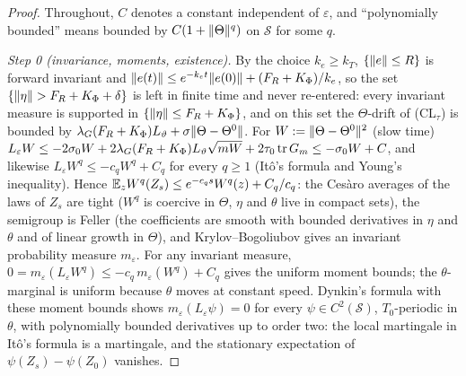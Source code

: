 \begin{proof}
Throughout, $C$ denotes a constant independent of $\varepsilon$, and ``polynomially bounded'' means bounded by
$C(1 + \lVert \Theta\rVert^q)$ on $\mathcal{S}$ for some $q$.

\smallskip
\emph{Step 0 (invariance, moments, existence).} By the choice $k_e\ge k_T$, $\{\lVert e\rVert\le R\}$ is forward invariant
and $\lVert e(t)\rVert\le e^{-k_et}\lVert e(0)\rVert + (F_R + K_\Phi)/k_e$, so the set $\{\lVert \eta\rVert > F_R + K_\Phi + \delta\}$
is left in finite time and never re-entered: every invariant measure is supported in $\{\lVert \eta\rVert\le F_R + K_\Phi\}$,
and on this set the $\Theta$-drift of (CL$_\tau$) is bounded by $\lambda_G(F_R + K_\Phi)L_\vartheta
+ \sigma\lVert \Theta - \Theta^0\rVert$. For $W := \lVert \Theta - \Theta^0\rVert^2$ (slow time)
$L_\varepsilon W\le-2\sigma_0W + 2\lambda_G(F_R + K_\Phi)L_\vartheta\sqrt{mW} + 2\tau_0\operatorname{tr} G_m\le-\sigma_0W + C$, and
likewise $L_\varepsilon W^q\le-c_qW^q + C_q$ for every $q\ge1$ (It\^o's formula and Young's inequality). Hence
$\mathbb{E}_zW^q(Z_s)\le e^{-c_qs}W^q(z) + C_q/c_q$: the Ces\`aro averages of the laws of $Z_s$ are tight ($W^q$ is coercive
in $\Theta$, $\eta$ and $\theta$ live in compact sets), the semigroup is Feller (the coefficients are smooth with
bounded derivatives in $\eta$ and $\theta$ and of linear growth in $\Theta$), and Krylov--Bogoliubov gives an
invariant probability measure $m_\varepsilon$. For any invariant measure,
$0 = m_\varepsilon(L_\varepsilon W^q)\le-c_q\,m_\varepsilon(W^q) + C_q$ gives the uniform moment bounds; the
$\theta$-marginal is uniform because $\theta$ moves at constant speed. Dynkin's formula with these moment bounds shows
$m_\varepsilon(L_\varepsilon\psi) = 0$ for every $\psi\in C^2(\mathcal{S})$, $T_0$-periodic in $\theta$, with
polynomially bounded derivatives up to order two: the local martingale in It\^o's formula is a martingale, and the
stationary expectation of $\psi(Z_s) - \psi(Z_0)$ vanishes.


\end{proof}
